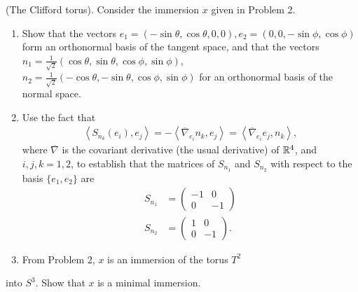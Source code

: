 \documentclass[12pt]{article}
\begin{document}
\begin{problem}[6.8]
	(The Clifford torus). Consider the immersion $ x$ given in Problem 2.
	 \begin{enumerate}[label=(\alph*)]
		\item Show that the vectors $ e_1 = (-\sin \theta, \cos \theta, 0,0), e_2 = (0,0,-\sin \phi,\cos \phi)$ form an orthonormal basis of the tangent space, and that the vectors $ n_1 = \frac{1}{\sqrt{2} } (\cos \theta, \sin \theta, \cos \phi, \sin \phi)$, $ n_2 = \frac{1}{\sqrt{2} } (-\cos \theta, - \sin \theta, \cos \phi, \sin \phi)$ for an orthonormal basis of the normal space.
		\item Use the fact that
		\begin{align*}
			\left\langle S_{n_k}(e_i),e_j \right\rangle = -\left\langle \overline{\nabla}_{e_i} n_k , e_j \right\rangle = \left\langle \overline{\nabla}_{e_i} e_j, n_k \right\rangle,
		\end{align*}
		where $ \overline{\nabla}$ is the covariant derivative (the usual derivative) of $ \mathbb{R}^{4}$, and $ i,j,k = 1,2$, to establish that the matrices of  $ S_{n_1}$ and $ S_{n_2}$ with respect to the basis $ \{e_1,e_2\} $ are
	\begin{align*}
		S_{n_1} &= \begin{pmatrix} -1&0\\0&-1 \end{pmatrix}  \\
		S_{n_2} &= \begin{pmatrix} 1&0\\0&-1 \end{pmatrix}  .
	\end{align*}
\item From Problem 2, $ x$ is an immersion of the torus  $ T^2$
	\end{enumerate} into $ S^3$. Show that $ x$ is a minimal immersion.
\end{problem}
\end{document}
